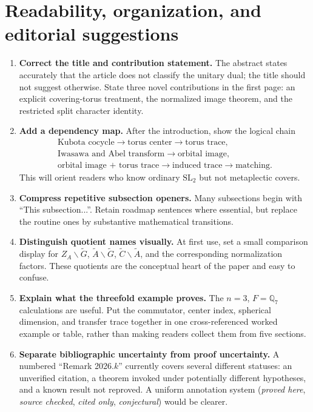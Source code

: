 \documentclass[12pt,letterpaper]{article}
\newcommand{\Gt}{\widetilde G}
\newcommand{\At}{\widetilde A}
\newcommand{\ZA}{Z_A}
\newcommand{\SL}{\mathrm{SL}}
\begin{document}
\section{Readability, organization, and editorial suggestions}

\begin{enumerate}[label=\textbf{E\arabic*.}]
\item \textbf{Correct the title and contribution statement.} The abstract states accurately that the article does not classify the unitary dual; the title should not suggest otherwise. State three novel contributions in the first page: an explicit covering-torus treatment, the normalized image theorem, and the restricted split character identity.
\item \textbf{Add a dependency map.} After the introduction, show the logical chain
\[
\begin{gathered}
\text{Kubota cocycle}\longrightarrow\text{torus center}\longrightarrow\text{torus trace},\\[2pt]
\text{Iwasawa and Abel transform}\longrightarrow\text{orbital image},\\[2pt]
\text{orbital image + torus trace}\longrightarrow\text{induced trace}\longrightarrow\text{matching}.
\end{gathered}
\]
This will orient readers who know ordinary $\SL_2$ but not metaplectic covers.
\item \textbf{Compress repetitive subsection openers.} Many subsections begin with ``This subsection...''. Retain roadmap sentences where essential, but replace the routine ones by substantive mathematical transitions.
\item \textbf{Distinguish quotient names visually.} At first use, set a small comparison display for $\ZA\backslash\Gt$, $\At\backslash\Gt$, $\widetilde C\backslash\At$, and the corresponding normalization factors. These quotients are the conceptual heart of the paper and easy to confuse.
\item \textbf{Explain what the threefold example proves.} The $n=3$, $F=\mathbb Q_7$ calculations are useful. Put the commutator, center index, spherical dimension, and transfer trace together in one cross-referenced worked example or table, rather than making readers collect them from five sections.
\item \textbf{Separate bibliographic uncertainty from proof uncertainty.} A numbered ``Remark 2026.$k$'' currently covers several different statuses: an unverified citation, a theorem invoked under potentially different hypotheses, and a known result not reproved. A uniform annotation system (\emph{proved here}, \emph{source checked}, \emph{cited only}, \emph{conjectural}) would be clearer.

\end{enumerate}
\end{document}
